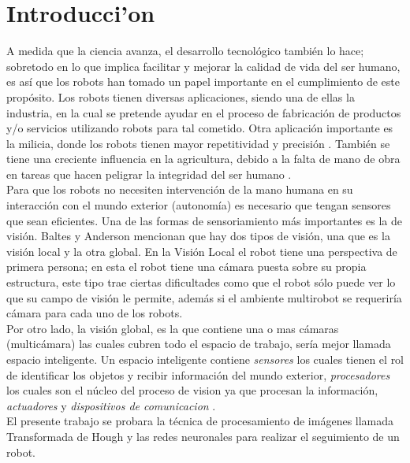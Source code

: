 
\chapter*{Introducci'on}

A medida que la ciencia avanza, el desarrollo tecnol\'ogico tambi\'en lo hace; sobretodo en lo que implica facilitar y mejorar la calidad de vida del ser humano, es as\'i que los robots han tomado un papel importante en el cumplimiento de este prop\'osito. Los robots tienen diversas aplicaciones, siendo una de ellas la industria, en la cual se pretende ayudar en el proceso de fabricaci\'on de productos y/o servicios utilizando robots para tal cometido\cite{Morales_g}. Otra aplicaci\'on importante es la milicia, donde los robots tienen mayor repetitividad y precisi\'on \cite{Garcia_g}. Tambi\'en se tiene una creciente influencia en la agricultura, debido a la falta de mano de obra en tareas que hacen peligrar la integridad del ser humano \cite{Vasquez_g}.\\
Para que los robots no necesiten intervenci\'on de la  mano humana  en  su  interacci\'on    con el mundo exterior (autonom\'ia) es necesario que tengan sensores que sean eficientes. Una de las formas de sensoriamiento m\'as importantes es la de visi\'on. Baltes y Anderson mencionan que hay dos tipos de visi\'on, una que es la visi\'on local y la otra global. En la Visi\'on Local el robot tiene  una perspectiva de primera persona; en esta el robot tiene una c\'amara puesta sobre su propia estructura, este tipo trae ciertas dificultades como que el robot s\'olo puede ver lo que su campo de visi\'on le permite, adem\'as si el ambiente multirobot se requerir\'ia c\'amara para cada uno de los robots.  \cite {Baltes_g} \\
Por otro lado, la visi\'on global, es la que contiene una o mas c\'amaras (multic\'amara) las cuales cubren todo el espacio de trabajo, ser\'ia mejor llamada  espacio inteligente. Un espacio inteligente contiene \textit{sensores} los cuales tienen el rol de identificar los objetos y recibir informaci\'on del mundo exterior, \textit{procesadores} los cuales  son el n\'ucleo del proceso de vision ya que procesan la informaci\'on, \textit{actuadores}  y \textit{dispositivos de comunicacion} \cite{Brezac_g}.\\

El presente trabajo se probara la t\'ecnica de procesamiento de im\'agenes llamada Transformada de Hough y las redes neuronales  para realizar el seguimiento de un robot. \\
